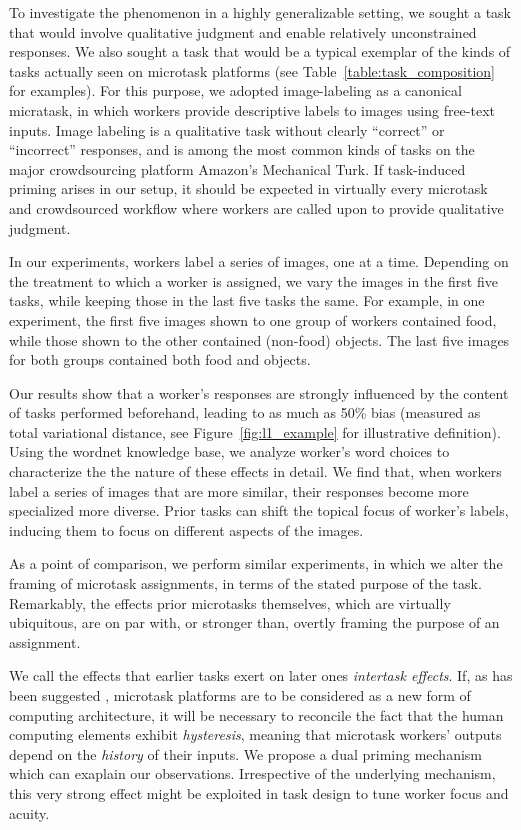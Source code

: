 \documentclass{sigchi}
\begin{document}
To investigate the phenomenon in a
highly generalizable setting, we sought a task that would involve 
qualitative judgment and enable relatively unconstrained responses. 
We also sought a task that would be a typical exemplar of the kinds of
tasks actually seen on microtask platforms (see 
Table~\ref{table:task_composition} for examples).  For this purpose, we 
adopted
image-labeling as a canonical micratask, in which workers provide 
descriptive labels to images using free-text inputs.  Image labeling is
a qualitative task without clearly ``correct'' or ``incorrect'' responses,
and is among the most common kinds of tasks on the major crowdsourcing
platform Amazon's Mechanical Turk.  If task-induced priming arises in our 
setup, it should be expected in virtually every microtask and 
crowdsourced workflow where workers are called upon to provide qualitative
judgment.

In our experiments, workers label a series of images, one at a time.
Depending on the treatment to which a worker is assigned, we vary the
images in the first five tasks, while keeping those in the last five tasks 
the same.  For example, in one experiment, the first five images shown to
one group of workers contained food, while those shown to the other 
contained (non-food) objects.  The last five images for both
groups contained both food and objects.

Our results show that a worker's responses are strongly influenced by 
the content of tasks performed beforehand, leading to as much as 50\%
bias (measured as total variational distance, 
see Figure~\ref{fig:l1_example} for illustrative definition).  
Using the wordnet 
knowledge base, we analyze worker's word choices to characterize the 
the nature of these effects in detail.  We find that, when workers 
label a series of images that are more similar, their responses become 
more specialized more diverse.  Prior tasks can shift the topical focus of 
worker's labels, inducing them to focus on different aspects of the images.

As a point of comparison, we perform similar experiments, in which we
alter the framing of microtask assignments, in terms of the stated purpose
of the task.  Remarkably, the effects prior microtasks themselves,
which are virtually ubiquitous, are on par with, or stronger than, 
overtly framing the purpose of an assignment.

We call the effects that earlier tasks exert on later ones 
\textit{intertask effects}.  If, as has been suggested \cite{5543192}, 
microtask platforms are to be considered as a new form of computing 
architecture, it will be necessary to reconcile the fact that the human 
computing elements exhibit \textit{hysteresis}, 
meaning that microtask workers' outputs 
depend on the \textit{history} of their inputs.
We propose a dual priming mechanism which can exaplain our
observations.  Irrespective of the underlying mechanism, this 
very strong effect might be exploited in task design to tune worker 
focus and acuity.
\end{document}
